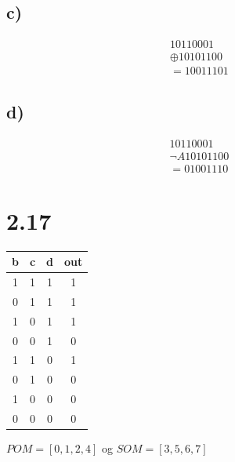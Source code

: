 \documentclass{article}
\begin{document}
\subsection*{c)}
\begin{align*}
    10110001&\\
    \oplus 10101100&\\
    =10011101
\end{align*}

\subsection*{d)}
\begin{align*}
    10110001&\\
    \lnot A  10101100&\\
    =01001110
\end{align*}

\section*{2.17}
\begin{center}
    \begin{tabular}{|c|c|c|c|}
        \hline
        b&c&d&out\\
        \hline
        1&1&1&1\\
        0&1&1&1\\
        1&0&1&1\\
        0&0&1&0\\
        1&1&0&1\\
        0&1&0&0\\
        1&0&0&0\\
        0&0&0&0\\
        \hline
    \end{tabular}
\end{center}
$POM=[0,1,2,4]$ og $SOM=[3,5,6,7]$

\newpage
\end{document}
